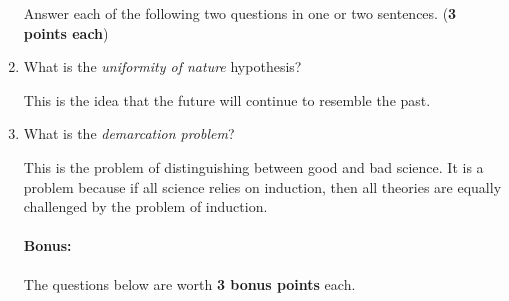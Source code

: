 \documentclass[10pt]{article}
\begin{document}
\begin{enumerate}


Answer each of the following two questions in one or two sentences. (\textbf{3 points each})

\setlength\itemsep{2cm}
\item What is the \textit{uniformity of nature} hypothesis?

This is the idea that the future will continue to resemble the past.

\item What is the \textit{demarcation problem}?

This is the problem of distinguishing between good and bad science.  It is a problem because if all science relies on induction, then all theories are equally challenged by the problem of induction.


\newpage

\paragraph{Bonus:} The questions below are worth \textbf{3 bonus points} each.


\end{enumerate}
\end{document}
